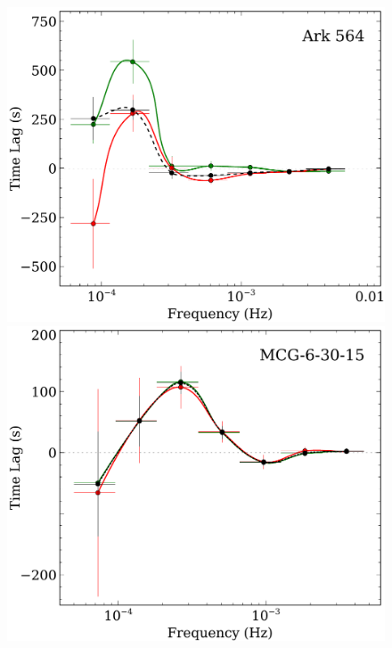 \documentclass{article}
\begin{document}
\begin{figure}
\centering
\includegraphics[scale=0.4]{images/Ark564-lag-results-lo-hi-flux-FP.pdf}
\includegraphics[scale=0.4]{images/MCG-lag-results-lo-hi-flux-FP.pdf}\\
\vspace{0.5cm}

\end{figure}
\end{document}
